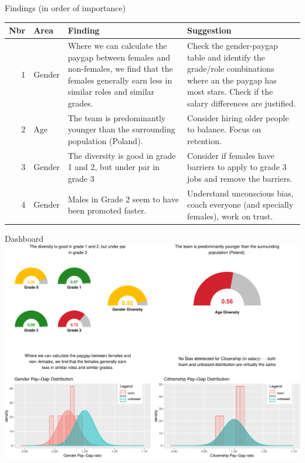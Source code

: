 \documentclass[
  ignorenonframetext,
  usenames,
  dvipsnames]{beamer}
\begin{document}
\begin{frame}{Findings (in order of importance)}
\protect\hypertarget{findings-in-order-of-importance}{}
\small

\begin{tabular}{r|l|>{\raggedright\arraybackslash}p{12em}|>{\raggedright\arraybackslash}p{12em}}
\hline
Nbr & Area & Finding & Suggestion\\
\hline
1 & Gender & Where we can calculate the paygap between females and non-females, we find that the females generally earn less in similar roles and similar grades. & Check the gender-paygap table and identify the grade/role combinations where an the paygap has most stars. Check if the salary differences are justified.\\
\hline
2 & Age & The team is predominantly younger than the surrounding population (Poland). & Consider hiring older people to balance. Focus on retention.\\
\hline
3 & Gender & The diversity is good in grade 1 and 2, but under par in grade 3 & Consider if females have barriers to apply to grade 3 jobs and remove the barriers.\\
\hline
4 & Gender & Males in Grade 2 seem to have been promoted faster. & Understand unconscious bias, coach everyone (and specially females), work on trust.\\
\hline
\end{tabular}
\end{frame}

\begin{frame}{Dashboard}
\protect\hypertarget{dashboard}{}
\includegraphics{team_slides_files/figure-beamer/dash-1.pdf}
\end{frame}
\end{document}
